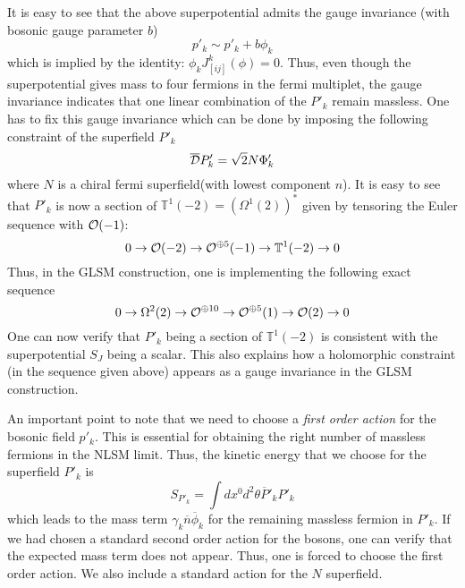 \documentclass[a4paper,12pt]{article}
\def\Bbb{\mathbb}
\def\BT{\Bbb T}
\begin{document}
It is easy to see that
the above superpotential admits the gauge invariance (with bosonic
gauge parameter $b$)
\begin{equation}
p'_k \sim p'_k + b \phi_k 
\end{equation}
which is implied by the identity:  $\phi_k J_{[ij]}^k(\phi)=0$.  
Thus, even though the superpotential gives mass to four fermions
in the fermi multiplet, the gauge invariance indicates that
one linear combination of the $P'_k$ remain massless. 
One has to fix this gauge invariance which can be done by
imposing the following constraint of the superfield $ P'_k$
\begin{equation}
\overline{\cal D} P'_k = \sqrt2  N \Phi'_k
\end{equation}
where $N$ is a chiral fermi superfield(with lowest component $n$). 
It is easy to see that $P'_k$ is now
a section of $\BT^1(-2)=(\Omega^1(2))^*$ given by tensoring the Euler
sequence with ${\cal O}(-1)$:
\begin{equation}
0\rightarrow {\cal O}(-2)
\rightarrow {\cal O}^{\oplus 5}(-1)\rightarrow
\BT^1(-2)\rightarrow 0
\end{equation}
Thus, in the GLSM construction, one is  implementing
the following exact sequence
\begin{equation}
0\rightarrow \Omega^{2}(2)
\rightarrow {\cal O}^{\oplus 10}\rightarrow
{\cal O}^{\oplus 5}(1)\rightarrow
{\cal O}(2)\rightarrow 0 
\end{equation}
One can now verify that $P'_k$ being a section of $\BT^1(-2)$ is
consistent with the superpotential $S_J$ being a scalar. 
This also explains
how a holomorphic constraint (in the sequence given above) appears
as a gauge invariance in the GLSM construction.


An important point to note that we need to choose a {\em first order
action} for the bosonic field $p'_k$. This is essential for obtaining the right
number of massless fermions in the NLSM limit. Thus, the kinetic energy
that we choose for the superfield  $P'_k$ is
\begin{equation}
S_{P'_k} = \int dx^0 d^2\theta \overline{P}'_k P'_k
\end{equation}
which leads to the mass term $\gamma_k \overline{n} \overline{\phi}_k$ for the
remaining massless fermion in $P'_k$. If we had chosen a standard
second order action for the bosons, one can verify that the expected
mass term does not appear. Thus, one is forced to choose the first
order action. We also include a standard action for the $N$ superfield. 
\end{document}
